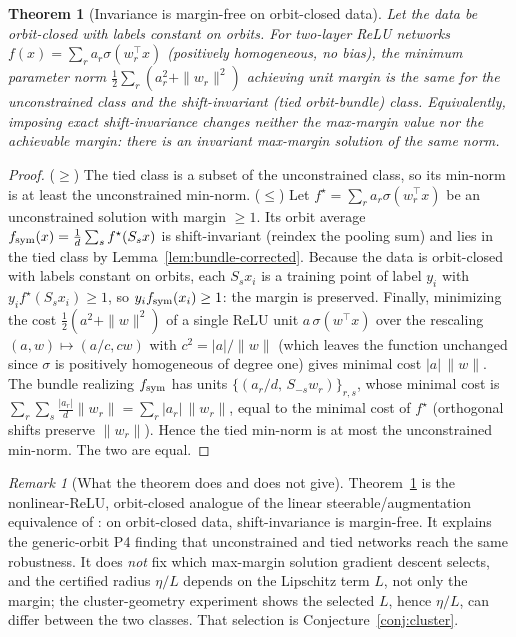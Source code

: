 \documentclass[11pt]{article}
\theoremstyle{plain}
\newtheorem{theorem}{Theorem}
\theoremstyle{definition}
\theoremstyle{remark}
\newtheorem{remark}{Remark}
\begin{document}
\begin{theorem}[Invariance is margin-free on orbit-closed data]\label{thm:selfsym}
Let the data be orbit-closed with labels constant on orbits.  For two-layer ReLU networks $f(x)=\sum_r a_r\sigma(w_r^\top x)$ (positively homogeneous, no bias), the minimum parameter norm $\tfrac12\sum_r(a_r^2+\|w_r\|^2)$ achieving unit margin is the same for the unconstrained class and the shift-invariant (tied orbit-bundle) class.  Equivalently, imposing exact shift-invariance changes neither the max-margin value nor the achievable margin: there is an invariant max-margin solution of the same norm.
\end{theorem}
\begin{proof}
($\ge$) The tied class is a subset of the unconstrained class, so its min-norm is at least the unconstrained min-norm.
($\le$) Let $f^\star=\sum_r a_r\sigma(w_r^\top x)$ be an unconstrained solution with margin $\ge1$.  Its orbit average $f_{\rm sym}(x)=\frac1d\sum_s f^\star(S_sx)$ is shift-invariant (reindex the pooling sum) and lies in the tied class by Lemma~\ref{lem:bundle-corrected}.  Because the data is orbit-closed with labels constant on orbits, each $S_sx_i$ is a training point of label $y_i$ with $y_if^\star(S_sx_i)\ge1$, so $y_if_{\rm sym}(x_i)\ge1$: the margin is preserved.  Finally, minimizing the cost $\tfrac12(a^2+\|w\|^2)$ of a single ReLU unit $a\,\sigma(w^\top x)$ over the rescaling $(a,w)\mapsto(a/c,cw)$ with $c^2=|a|/\|w\|$ (which leaves the function unchanged since $\sigma$ is positively homogeneous of degree one) gives minimal cost $|a|\,\|w\|$.  The bundle realizing $f_{\rm sym}$ has units $\{(a_r/d,\,S_{-s}w_r)\}_{r,s}$, whose minimal cost is $\sum_r\sum_s \tfrac{|a_r|}{d}\|w_r\|=\sum_r |a_r|\,\|w_r\|$, equal to the minimal cost of $f^\star$ (orthogonal shifts preserve $\|w_r\|$).  Hence the tied min-norm is at most the unconstrained min-norm.  The two are equal.
\end{proof}

\begin{remark}[What the theorem does and does not give]\label{rem:selfsym}
Theorem~\ref{thm:selfsym} is the nonlinear-ReLU, orbit-closed analogue of the linear steerable/augmentation equivalence of \citet{ChenZhu2023}: on orbit-closed data, shift-invariance is margin-free.  It explains the generic-orbit P4 finding that unconstrained and tied networks reach the same robustness.  It does \emph{not} fix which max-margin solution gradient descent selects, and the certified radius $\eta/L$ depends on the Lipschitz term $L$, not only the margin; the cluster-geometry experiment shows the selected $L$, hence $\eta/L$, can differ between the two classes.  That selection is Conjecture~\ref{conj:cluster}.
\end{remark}
\end{document}
